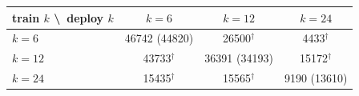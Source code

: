 \begin{tabular}{lccc}
\hline
train $k$ \textbackslash\ deploy $k$ & $k=6$ & $k=12$ & $k=24$\\
\hline
$k=6$ & 46742 (44820) & 26500$^{\dagger}$ & 4433$^{\dagger}$\\
$k=12$ & 43733$^{\dagger}$ & 36391 (34193) & 15172$^{\dagger}$\\
$k=24$ & 15435$^{\dagger}$ & 15565$^{\dagger}$ & 9190 (13610)\\
\hline
\end{tabular}